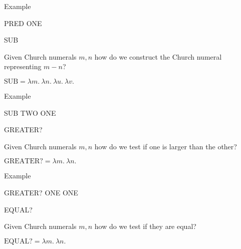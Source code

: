 \documentclass{beamer}
\begin{document}
\begin{frame}{Example}
    
    PRED ONE
    \vspace{6cm}
     
\end{frame}

\begin{frame}{SUB}

    Given Church numerals $m,n$ how do we construct the Church numeral representing $m-n$?
    
    \vspace{0.3cm}
    
    $\text{SUB} = \lambda m. \ \lambda n. \ \lambda u. \ \lambda v. \ $
    
    \vspace{6cm}
    
\end{frame}

\begin{frame}{Example}
    
    SUB TWO ONE
    \vspace{6cm}
         
\end{frame}

\begin{frame}{GREATER?}

    Given Church numerals $m,n$ how do we test if one is larger than the other?
    
    \vspace{0.3cm}
    
    $\text{GREATER?} = \lambda m. \ \lambda n. \ $
    
    \vspace{6cm}  

\end{frame}

\begin{frame}{Example}

    GREATER? ONE ONE
    \vspace{6cm}
    
\end{frame}

\begin{frame}{EQUAL?}

    Given Church numerals $m,n$ how do we test if they are equal?
    
    \vspace{0.3cm}

    $\text{EQUAL?} = \lambda m. \ \lambda n. \ $

\vspace{6cm}      
\end{frame}
\end{document}
